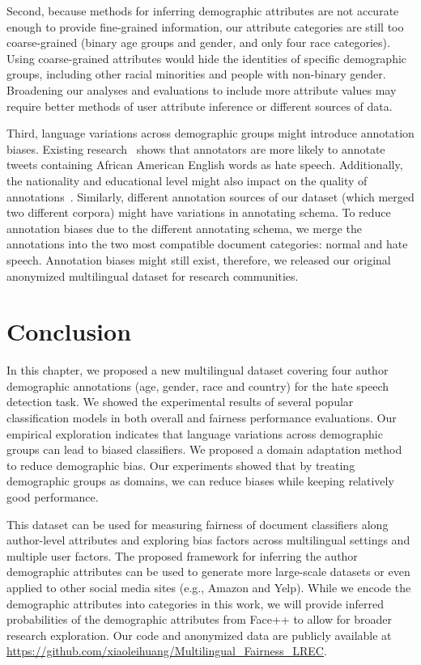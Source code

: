 Second, because methods for inferring demographic attributes are not accurate enough to provide fine-grained information, our attribute categories are still too coarse-grained (binary age groups and gender, and only four race categories).
Using coarse-grained attributes would hide the identities of specific demographic groups, including other racial minorities and people with non-binary gender.
Broadening our analyses and evaluations to include more attribute values may require better methods of user attribute inference or different sources of data.

Third, language variations across demographic groups might introduce annotation biases. Existing research~\cite{sap2019risk} shows that annotators are more likely to annotate tweets containing African American English words as hate speech.
Additionally, the nationality and educational level might also impact on the quality of annotations~\cite{founta2018large}.
Similarly, different annotation sources of our dataset (which merged two different corpora) might have variations in annotating schema.
To reduce annotation biases due to the different annotating schema,
we merge the annotations into the two most compatible document categories: normal and hate speech.
Annotation biases might still exist, therefore, 
we released our original anonymized multilingual dataset for research communities.


\section{Conclusion}

In this chapter, we proposed a new multilingual dataset covering four author demographic annotations (age, gender, race and country) for the hate speech detection task.
We showed the experimental results of several popular classification models in both overall and fairness performance evaluations. 
Our empirical exploration indicates that language variations across demographic groups can lead to biased classifiers.
We proposed a domain adaptation method to reduce demographic bias. 
Our experiments showed that by treating demographic groups as domains, we can reduce biases while keeping relatively good performance.

This dataset can be used for measuring fairness of document classifiers along author-level attributes and exploring bias factors across multilingual settings and multiple user factors.
The proposed framework for inferring the author demographic attributes can be used to generate more large-scale datasets or even applied to other social media sites (e.g., Amazon and Yelp).
While we encode the demographic attributes into categories in this work, 
we will provide inferred probabilities of the demographic attributes from Face++ to allow for broader research exploration.
Our code and anonymized data are publicly available at \url{https://github.com/xiaoleihuang/Multilingual_Fairness_LREC}.

